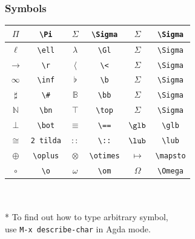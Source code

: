 \documentclass[xetex]{beamer}
\begin{document}
\begin{frame}
  \frametitle{Symbols}
  \begin{center}
  \begin{tabular}{ | c | c | c | c | c | c | }
  \hline
    $\Pi$ & \texttt{\textbackslash Pi}
    & $\Sigma$ & \texttt{\textbackslash Sigma}
    & $\Sigma$ & \texttt{\textbackslash Sigma}
    \\  \hline
    $\ell$ & \texttt{\textbackslash ell}
    & $\lambda$ & \texttt{\textbackslash Gl}
    & $\Sigma$ & \texttt{\textbackslash Sigma}
    \\  \hline
    $\rightarrow$ & \texttt{\textbackslash r}
    & $\langle$ & \texttt{\textbackslash <}
    & $\Sigma$ & \texttt{\textbackslash Sigma}
    \\  \hline
    $\infty$ & \texttt{\textbackslash inf}
    & $\flat$ & \texttt{\textbackslash b}
    & $\Sigma$ & \texttt{\textbackslash Sigma}
    \\  \hline
    $\sharp$ & \texttt{\textbackslash \#}
    & $\mathbb{B}$ & \texttt{\textbackslash bb}
    & $\Sigma$ & \texttt{\textbackslash Sigma}
    \\  \hline
    $\mathbb{N}$ & \texttt{\textbackslash bn}
    & $\top$ & \texttt{\textbackslash top}
    & $\Sigma$ & \texttt{\textbackslash Sigma}
    \\  \hline
    $\bot$ & \texttt{\textbackslash bot}
    & $\equiv$ & \texttt{\textbackslash ==}
    & $\glb$ & \texttt{\textbackslash glb}
    \\  \hline
    $\cong$ & \texttt{2 tilda}
    & $::$ & \texttt{\textbackslash ::}
    & $\lub$ & \texttt{\textbackslash lub}
    \\  \hline
    $\oplus$ & \texttt{\textbackslash oplus}
    & $\otimes$ & \texttt{\textbackslash otimes}
    & $\mapsto$ & \texttt{\textbackslash mapsto}
    \\  \hline
    $\circ$ & \texttt{\textbackslash o}
    & $\omega$ & \texttt{\textbackslash om}
    & $\Omega$ & \texttt{\textbackslash Omega}
    \\  \hline 
  \end{tabular}
  \\ \\ * To find out how to type arbitrary symbol,
  \\ use \texttt{M-x describe-char} in Agda mode.
  \end{center}
\end{frame}
\end{document}
